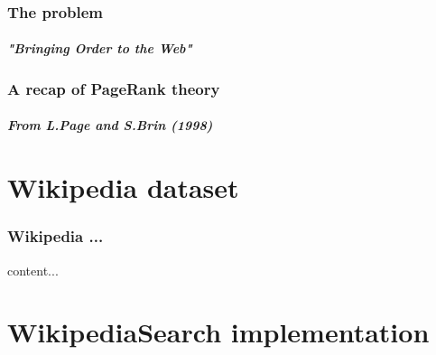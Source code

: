 \documentclass{beamer}
\begin{document}
\begin{frame}
	
		
	\end{frame}
	
	\begin{frame}
		\frametitle{The problem}
		\framesubtitle{\textit{"Bringing Order to the Web"}}
	
	\end{frame}

	\begin{frame}
		\frametitle{A recap of PageRank theory}
		\framesubtitle{\textit{From L.Page and S.Brin (1998)}}
	\end{frame}
	
	
	\section{Wikipedia dataset}
	
	\begin{frame}
		\frametitle{Wikipedia ...}
		content...
	\end{frame}

	\section{WikipediaSearch implementation}
	
\end{document}

